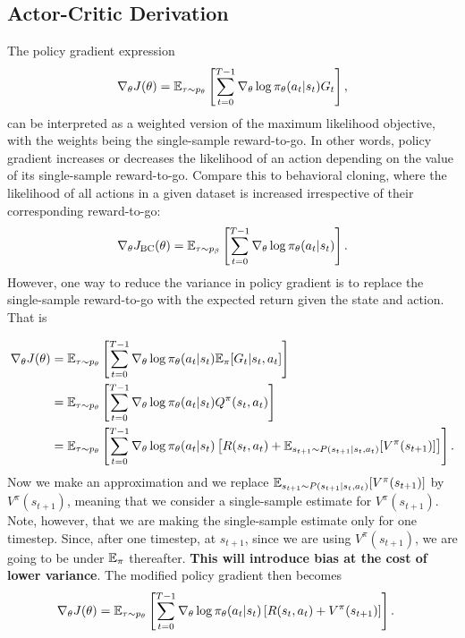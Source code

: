 \documentclass{article}
\begin{document}
\subsection{Actor-Critic Derivation}

The policy gradient expression
\begin{align*}
    \nabla_\theta J(\theta) = {\mathbb E}_{\tau \sim p_\theta} \left[\sum_{t=0}^{T-1} \nabla_\theta \log \pi_\theta(a_t \vert s_t) G_t\right],
\end{align*}
can be interpreted as a weighted version of the maximum likelihood objective, with the weights being the single-sample reward-to-go. In other words, policy gradient increases or decreases the likelihood of an action depending on the value of its single-sample reward-to-go. Compare this to behavioral cloning, where the likelihood of all actions in a given dataset is increased irrespective of their corresponding reward-to-go:
\begin{align*}
    \nabla_\theta J_{\rm {BC}}(\theta) = {\mathbb E}_{\tau \sim p_\beta} \left[\sum_{t=0}^{T-1} \nabla_\theta \log \pi_\theta(a_t \vert s_t)\right].
\end{align*}
However, one way to reduce the variance in policy gradient is to replace the single-sample reward-to-go with the expected return given the state and action. That is

\begin{align*}
    \nabla_\theta J(\theta) &= {\mathbb E}_{\tau \sim p_\theta} \left[\sum_{t=0}^{T-1} \nabla_\theta \log \pi_\theta(a_t \vert s_t) {\mathbb E}_\pi[G_t \vert s_t, a_t]\right] \\
    &= {\mathbb E}_{\tau \sim p_\theta} \left[\sum_{t=0}^{T-1} \nabla_\theta \log \pi_\theta(a_t \vert s_t) Q^\pi(s_t,a_t)\right]\\
    &= {\mathbb E}_{\tau \sim p_\theta} \left[\sum_{t=0}^{T-1} \nabla_\theta \log \pi_\theta(a_t \vert s_t) \left[R(s_t, a_t)+ {\mathbb E}_{s_{t+1}\sim P(s_{t+1}\vert s_t, a_t)}[V^\pi(s_{t+1})]\right]\right].
\end{align*}
Now we make an approximation and we replace ${\mathbb E}_{s_{t+1}\sim P(s_{t+1}\vert s_t, a_t)}[V^\pi(s_{t+1})]$ by $V^\pi(s_{t+1})$, meaning that we consider a single-sample estimate for $V^\pi(s_{t+1})$. Note, however, that we are making the single-sample estimate only for one timestep. Since, after one timestep, at $s_{t+1}$, since we are using $V^\pi(s_{t+1})$, we are going to be under ${\mathbb E}_\pi$ thereafter. \textbf{This will introduce bias at the cost of lower variance}. The modified policy gradient then becomes
\begin{align*}
    \nabla_\theta J(\theta) &= {\mathbb E}_{\tau \sim p_\theta} \left[\sum_{t=0}^{T-1} \nabla_\theta \log \pi_\theta(a_t \vert s_t) \left[R(s_t, a_t)+ V^\pi(s_{t+1})\right]\right].
\end{align*}
\end{document}

